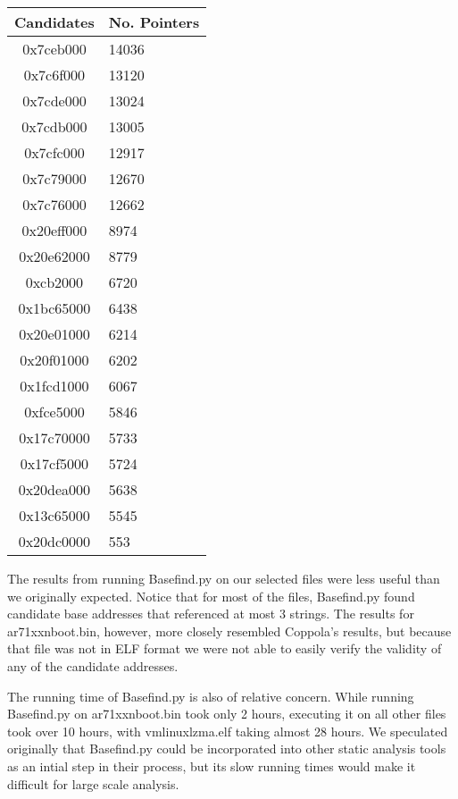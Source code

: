 \documentclass[letterpaper,twocolumn,10pt]{article}
\begin{document}
\begin{center}
    \begin{tabular}{| c | p{3cm} |}
        \hline
        Candidates & No. Pointers\\ \hline
        0x7ceb000 & 14036\\ \hline
        0x7c6f000 & 13120\\ \hline
        0x7cde000 & 13024\\ \hline
        0x7cdb000 & 13005\\ \hline
        0x7cfc000 & 12917\\ \hline
        0x7c79000 & 12670\\ \hline
        0x7c76000 & 12662\\ \hline
        0x20eff000 & 8974\\ \hline
        0x20e62000 & 8779\\ \hline
        0xcb2000 & 6720\\ \hline
        0x1bc65000 & 6438\\ \hline
        0x20e01000 & 6214\\ \hline
        0x20f01000 & 6202\\ \hline
        0x1fcd1000 & 6067\\ \hline
        0xfce5000 & 5846\\ \hline
        0x17c70000 & 5733\\ \hline
        0x17cf5000 & 5724\\ \hline
        0x20dea000 & 5638\\ \hline
        0x13c65000 & 5545\\ \hline
        0x20dc0000 & 553\\ \hline
    \end{tabular}
\end{center}

The results from running Basefind.py on our selected files were less useful than we originally expected. Notice that for most of the files, Basefind.py found candidate base addresses that referenced at most 3 strings. The results for ar71xxnboot.bin, however, more closely resembled Coppola's results, but because that file was not in ELF format we were not able to easily verify the validity of any of the candidate addresses. 

The running time of Basefind.py is also of relative concern. While running Basefind.py on ar71xxnboot.bin took only 2 hours, executing it on all other files took over 10 hours, with vmlinuxlzma.elf taking almost 28 hours. We speculated originally that Basefind.py could be incorporated into other static analysis tools as an intial step in their process, but its slow running times would make it difficult for large scale analysis. 
\end{document}
